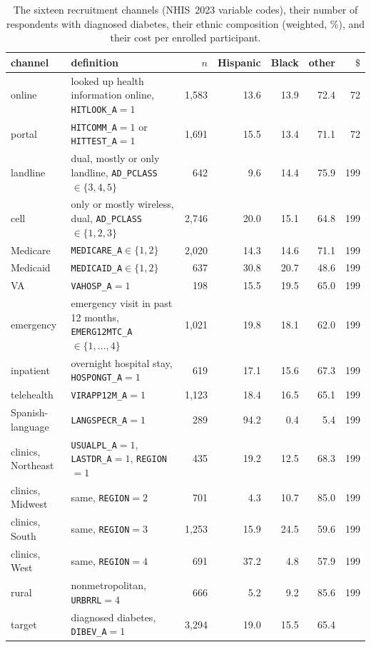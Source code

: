 \documentclass[twoside]{article}
\begin{document}
\begin{table}[!ht]
\caption{The sixteen recruitment channels (NHIS~2023 variable codes), their
number of respondents with diagnosed diabetes, their ethnic composition
(weighted, \%), and their cost per enrolled participant.}
\label{tab:channels}
\centering\small
\setlength{\tabcolsep}{3.5pt}
\begin{tabular}{llrrrrr}
\hline
channel & definition & \(n\) & Hispanic & Black & other & \(\$\)\\
\hline
online & looked up health information online, \texttt{HITLOOK\_A}\(=1\) & 1{,}583 & 13.6 & 13.9 & 72.4 & 72\\
portal & \texttt{HITCOMM\_A}\(=1\) or \texttt{HITTEST\_A}\(=1\) & 1{,}691 & 15.5 & 13.4 & 71.1 & 72\\
landline & dual, mostly or only landline, \texttt{AD\_PCLASS}\(\in\{3,4,5\}\) & 642 & 9.6 & 14.4 & 75.9 & 199\\
cell & only or mostly wireless, dual, \texttt{AD\_PCLASS}\(\in\{1,2,3\}\) & 2{,}746 & 20.0 & 15.1 & 64.8 & 199\\
Medicare & \texttt{MEDICARE\_A}\(\in\{1,2\}\) & 2{,}020 & 14.3 & 14.6 & 71.1 & 199\\
Medicaid & \texttt{MEDICAID\_A}\(\in\{1,2\}\) & 637 & 30.8 & 20.7 & 48.6 & 199\\
VA & \texttt{VAHOSP\_A}\(=1\) & 198 & 15.5 & 19.5 & 65.0 & 199\\
emergency & emergency visit in past 12 months, \texttt{EMERG12MTC\_A}\(\in\{1,\dots,4\}\) & 1{,}021 & 19.8 & 18.1 & 62.0 & 199\\
inpatient & overnight hospital stay, \texttt{HOSPONGT\_A}\(=1\) & 619 & 17.1 & 15.6 & 67.3 & 199\\
telehealth & \texttt{VIRAPP12M\_A}\(=1\) & 1{,}123 & 18.4 & 16.5 & 65.1 & 199\\
Spanish-language & \texttt{LANGSPECR\_A}\(=1\) & 289 & 94.2 & 0.4 & 5.4 & 199\\
clinics, Northeast & \texttt{USUALPL\_A}\(=1\), \texttt{LASTDR\_A}\(=1\), \texttt{REGION}\(=1\) & 435 & 19.2 & 12.5 & 68.3 & 199\\
clinics, Midwest & same, \texttt{REGION}\(=2\) & 701 & 4.3 & 10.7 & 85.0 & 199\\
clinics, South & same, \texttt{REGION}\(=3\) & 1{,}253 & 15.9 & 24.5 & 59.6 & 199\\
clinics, West & same, \texttt{REGION}\(=4\) & 691 & 37.2 & 4.8 & 57.9 & 199\\
rural & nonmetropolitan, \texttt{URBRRL}\(=4\) & 666 & 5.2 & 9.2 & 85.6 & 199\\
\hline
target & diagnosed diabetes, \texttt{DIBEV\_A}\(=1\) & 3{,}294 & 19.0 & 15.5 & 65.4 & \\
\hline
\end{tabular}
\end{table}
\end{document}
